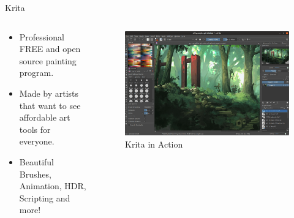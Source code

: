 \documentclass[presentation]{beamer}
\begin{document}
\begin{frame}[label={sec:org0699d60}]{Krita}
\begin{columns}
\begin{column}{0.4\columnwidth}
\begin{itemize}
\item Professional FREE and open source painting program.
\item Made by artists that want to see affordable art tools for everyone.
\item Beautiful Brushes, Animation, HDR, Scripting and more!
\end{itemize}
\end{column}
\begin{column}{0.6\columnwidth}
\begin{figure}[htbp]
\centering
\includegraphics[width=.9\linewidth]{./krita.png}
\caption{Krita in Action}
\end{figure}
\end{column}
\end{columns}
\end{frame}
\end{document}
